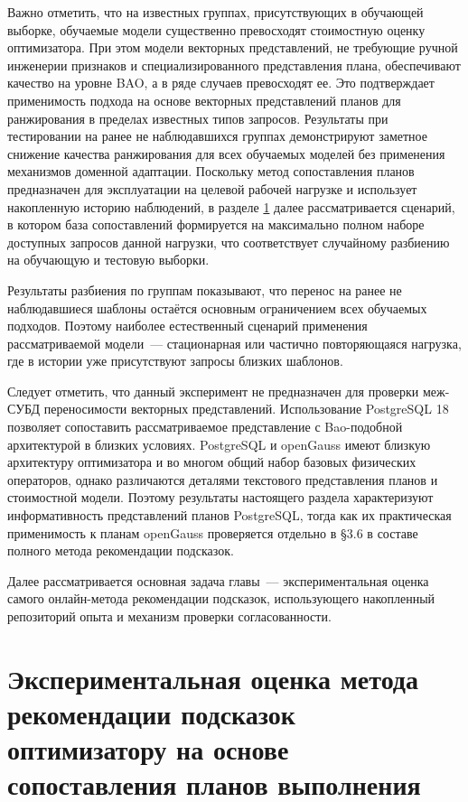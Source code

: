 Важно отметить, что на известных группах, присутствующих в обучающей выборке, обучаемые модели существенно превосходят стоимостную оценку оптимизатора. При этом модели векторных представлений, не требующие ручной инженерии признаков и специализированного представления плана, обеспечивают качество на уровне BAO, а в ряде случаев превосходят ее. Это подтверждает применимость подхода на основе векторных представлений планов для ранжирования в пределах известных типов запросов. Результаты при тестировании на ранее не наблюдавшихся группах демонстрируют заметное снижение качества ранжирования для всех обучаемых моделей без применения механизмов доменной адаптации. Поскольку метод сопоставления планов предназначен для эксплуатации на целевой рабочей нагрузке и использует накопленную историю наблюдений, в разделе \ref{sec:ch3/sec3} далее рассматривается сценарий, в котором база сопоставлений формируется на максимально полном наборе доступных запросов данной нагрузки, что соответствует случайному разбиению на обучающую и тестовую выборки.

Результаты разбиения по группам показывают, что перенос на ранее не наблюдавшиеся шаблоны остаётся основным ограничением всех обучаемых подходов. Поэтому наиболее естественный сценарий применения рассматриваемой модели~--- стационарная или частично повторяющаяся нагрузка, где в истории уже присутствуют запросы близких шаблонов.

Следует отметить, что данный эксперимент не предназначен для проверки меж-СУБД переносимости векторных представлений. Использование PostgreSQL 18 позволяет сопоставить рассматриваемое представление с Bao-подобной архитектурой в близких условиях. PostgreSQL и openGauss имеют близкую архитектуру оптимизатора и во многом общий набор базовых физических операторов, однако различаются деталями текстового представления планов и стоимостной модели. Поэтому результаты настоящего раздела характеризуют информативность представлений планов PostgreSQL, тогда как их практическая применимость к планам openGauss проверяется отдельно в \S 3.6 в составе полного метода рекомендации подсказок.

Далее рассматривается основная задача главы~--- экспериментальная оценка самого онлайн-метода рекомендации подсказок, использующего накопленный репозиторий опыта и механизм проверки согласованности.

\section{Экспериментальная оценка метода рекомендации подсказок оптимизатору на основе сопоставления планов выполнения}\label{sec:ch3/sec3}

